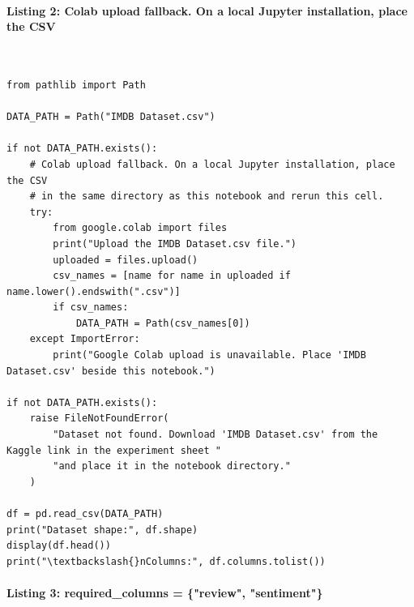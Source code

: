 \documentclass[12pt,a4paper,oneside]{report}
\begin{document}
\paragraph{Listing 2: Colab upload fallback. On a local Jupyter installation, place the CSV}\mbox{}\\[-1ex]
\begin{Verbatim}[commandchars=\\\{\},breaklines=true,breakanywhere=true,fontsize=\scriptsize,frame=leftline,framesep=2mm,rulecolor=\color{gray}]
from pathlib import Path

DATA_PATH = Path("IMDB Dataset.csv")

if not DATA_PATH.exists():
    # Colab upload fallback. On a local Jupyter installation, place the CSV
    # in the same directory as this notebook and rerun this cell.
    try:
        from google.colab import files
        print("Upload the IMDB Dataset.csv file.")
        uploaded = files.upload()
        csv_names = [name for name in uploaded if name.lower().endswith(".csv")]
        if csv_names:
            DATA_PATH = Path(csv_names[0])
    except ImportError:
        print("Google Colab upload is unavailable. Place 'IMDB Dataset.csv' beside this notebook.")

if not DATA_PATH.exists():
    raise FileNotFoundError(
        "Dataset not found. Download 'IMDB Dataset.csv' from the Kaggle link in the experiment sheet "
        "and place it in the notebook directory."
    )

df = pd.read_csv(DATA_PATH)
print("Dataset shape:", df.shape)
display(df.head())
print("\textbackslash{}nColumns:", df.columns.tolist())
\end{Verbatim}
\paragraph{Listing 3: required\_columns = \{"review", "sentiment"\}}\mbox{}\\[-1ex]
\end{document}
